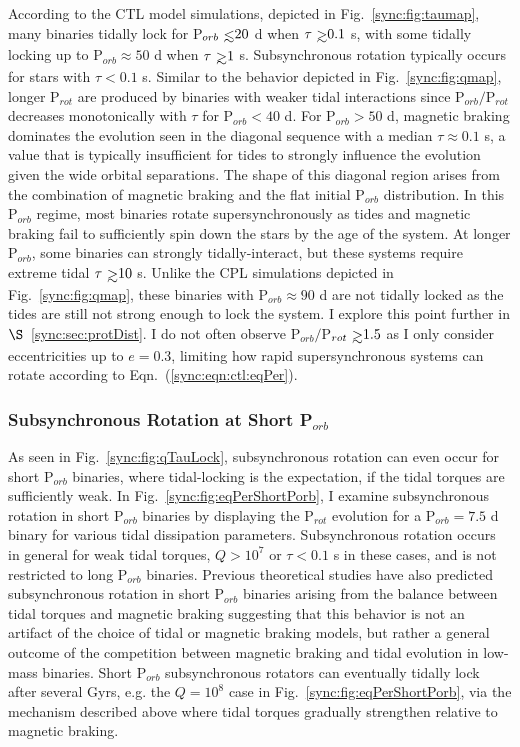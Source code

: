 According to the CTL model simulations, depicted in Fig.~\ref{sync:fig:taumap}, many binaries tidally lock for P$_{orb} \lsim 20$ d when $\tau \gsim 0.1$ s, with some tidally locking up to P$_{orb} \approx 50$ d when $\tau \gsim 1$ s. Subsynchronous rotation typically occurs for stars with $\tau < 0.1$ s. Similar to the behavior depicted in Fig.~\ref{sync:fig:qmap}, longer P$_{rot}$ are produced by binaries with weaker tidal interactions since P$_{orb}/$P$_{rot}$ decreases monotonically with $\tau$ for P$_{orb} < 40$ d.  For P$_{orb} > 50$ d, magnetic braking dominates the evolution seen in the diagonal sequence with a median $\tau \approx 0.1$ s, a value that is typically insufficient for tides to strongly influence the evolution given the wide orbital separations. The shape of this diagonal region arises from the combination of magnetic braking and the flat initial P$_{orb}$ distribution. In this P$_{orb}$ regime, most binaries rotate supersynchronously as tides and magnetic braking fail to sufficiently spin down the stars by the age of the system. At longer P$_{orb}$, some binaries can strongly tidally-interact, but these systems require extreme tidal $\tau \gsim 10$ s. Unlike the CPL simulations depicted in Fig.~\ref{sync:fig:qmap}, these binaries with P$_{orb} \approx 90$ d are not tidally locked as the tides are still not strong enough to lock the system. I explore this point further in $\S$~\ref{sync:sec:protDist}. I do not often observe P$_{orb}/$P$_{rot} \gsim 1.5$ as I only consider eccentricities up to $e = 0.3$, limiting how rapid supersynchronous systems can rotate according to Eqn.~(\ref{sync:eqn:ctl:eqPer}).


\subsubsection{Subsynchronous Rotation at Short P$_{orb}$} \label{sync:sec:shortPorbSubSync}

As seen in Fig.~\ref{sync:fig:qTauLock}, subsynchronous rotation can even occur for short P$_{orb}$ binaries, where tidal-locking is the expectation, if the tidal torques are sufficiently weak. In Fig.~\ref{sync:fig:eqPerShortPorb}, I examine subsynchronous rotation in short P$_{orb}$ binaries by displaying the P$_{rot}$ evolution for a P$_{orb} = 7.5$ d binary for various tidal dissipation parameters. Subsynchronous rotation occurs in general for weak tidal torques, $Q>10^7$ or $\tau < 0.1$ s in these cases, and is not restricted to long P$_{orb}$ binaries. Previous theoretical studies have also predicted subsynchronous rotation in short P$_{orb}$ binaries arising from the balance between tidal torques and magnetic braking \citep[e.g.][]{Habets1989,Zahn1994,Keppens1997} suggesting that this behavior is not an artifact of the choice of tidal or magnetic braking models, but rather a general outcome of the competition between magnetic braking and tidal evolution in low-mass binaries.  Short P$_{orb}$ subsynchronous rotators can eventually tidally lock after several Gyrs, e.g. the $Q=10^8$ case in Fig.~\ref{sync:fig:eqPerShortPorb}, via the mechanism described above where tidal torques gradually strengthen relative to magnetic braking. 

